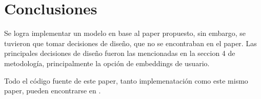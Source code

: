\documentclass[sigplan,screen]{acmart}
\begin{document}
\section{Conclusiones}
Se logra implementar un modelo en base al paper propuesto, sin embargo, se tuvieron que tomar decisiones de diseño, que no se encontraban en el paper. Las principales decisiones de diseño fueron las mencionadas en la seccion 4 de metodología, principalmente la opción de embeddings de usuario. 

Todo el código fuente de este paper, tanto implemenatación como este mismo paper, pueden encontrarse en \cite{source}.




\end{document}
